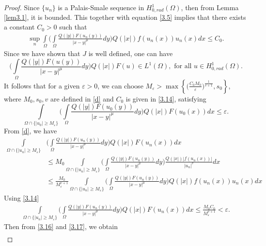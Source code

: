 \documentclass[11pt]{amsart}
\numberwithin{equation}{section}
\newcommand{\hr}{H^1_{0, rad}(\Omega)}
\newcommand{\1}{\frac{1}{2}}
\begin{document}
	\begin{proof} Since $\{u_n\}$ is a Palais-Smale sequence in $\hr$, then from Lemma \ref{lem3.1}, it is bounded. This together with equation \eqref{3.5} implies that  
		there exists a constant $C_0>0$ such that
		\begin{align}
			\sup_n\int\limits_{\Omega} \Bigg( \int\limits_{\Omega} \frac{Q(|y|)F(u_n(y))}{|x-y|^\mu}dy \Bigg) Q(|x|)f(u_n(x))u_n(x)dx \leq C_0. \label{3.14}
		\end{align}
		Since we have shown that $J$ is well defined, one can have 
		\begin{equation}
			\label{3.15} \Bigg( \int\limits_{\Omega} \frac{Q(|y|)F(u(y))}{|x-y|^\mu}dy \Bigg) Q(|x|)F(u) \in L^1(\Omega), \text{ for all } u \in \hr.
		\end{equation}
		It follows that for a given $\varepsilon>0$, we can choose $M_\varepsilon> \max\left\{ \Big(\frac{C_0 M_0}{\varepsilon}\Big)^{\frac{1}{v+1}}, s_0\right\}$,  	where $M_0, s_0, v$ are defined in \eqref{d} and $C_0$ is given in \eqref{3.14}, satisfying
		\begin{equation}
			\label{3.16}
			\int\limits_{\Omega \cap \{ |u_0|\geq M_\varepsilon\}} \Bigg( \int\limits_{\Omega} \frac{Q(|y|)F(u_0(y))}{|x-y|^\mu}dy \Bigg) Q(|x|)F(u_0(x))dx \leq \varepsilon.
		\end{equation}
		From \eqref{d}, we have
		\begin{align}
			\int\limits_{\Omega \cap \{ |u_n|\geq M_\varepsilon\}} &\Bigg( \int\limits_{\Omega} \frac{Q(|y|)F(u_n(y))}{|x-y|^\mu}dy \Bigg) Q(|x|)F(u_n(x))dx \nonumber\\
			&\leq M_0 \int\limits_{\Omega \cap \{ |u_n|\geq M_\varepsilon\}} \Bigg( \int\limits_{\Omega} \frac{Q(|y|)F(u_n(y))}{|x-y|^\mu}dy \Bigg)  \frac{Q(|x|)|f(u_n(x))|}{|u_n|^v}dx\nonumber\\
			&\leq \frac{M_0}{M_\varepsilon^{v+1}} \int\limits_{\Omega \cap \{ |u_n|\geq M_\varepsilon\}} \Bigg( \int\limits_{\Omega} \frac{Q(|y|)F(u_n(y))}{|x-y|^\mu}dy \Bigg) Q(|x|)f(u_n(x))u_n(x)dx\nonumber
		\end{align}
		Using \eqref{3.14}
		\begin{align}
			\label{3.17}
			\int\limits_{\Omega \cap \{ |u_n|\geq M_\varepsilon\}} \Bigg( \int\limits_{\Omega} \frac{Q(|y|)F(u_n(y))}{|x-y|^\mu}dy \Bigg) Q(|x|)F(u_n(x))dx 
			\leq \frac{M_0 C_0}{M_\varepsilon^{v+1}} <\varepsilon.
		\end{align}
		Then from \eqref{3.16} and \eqref{3.17}, we obtain
		\begin{align}

\end{align}
\end{proof}
\end{document}
